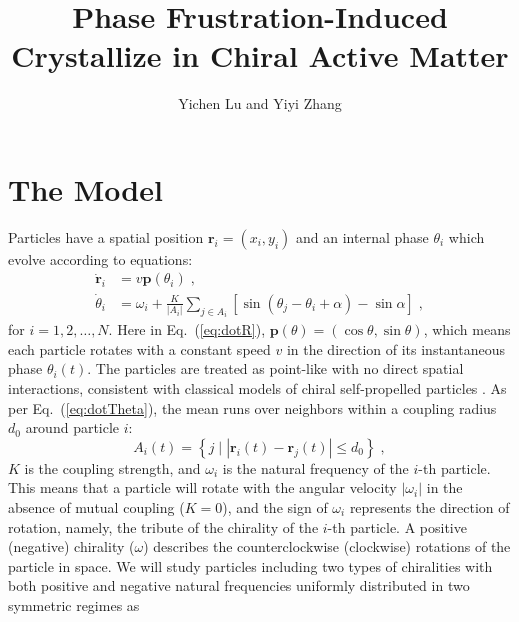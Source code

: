 \documentclass{article}
\title{\textbf{Phase Frustration-Induced Crystallize in Chiral Active Matter}}
\author{Yichen Lu and Yiyi Zhang}
\begin{document}
\maketitle

\tableofcontents

\section{The Model}

Particles have a spatial position $\mathbf{r}_i=\left( x_i, y_i \right)$ and an internal phase $\theta_i$ which evolve according to equations:
\begin{subequations} 
    \label{eq:totalDynamicsMeanField}
    \begin{align}
        \dot{\mathbf{r}}_i&=v\mathbf{p}\left( \theta _i \right)\;\label{eq:dotR},
        \\
        \dot{\theta}_i&=\omega _i+\frac{K}{\left| A_i \right|}\sum_{j\in A_i}{\left[ \sin \left( \theta _j-\theta _i+\alpha \right) -\sin \alpha \right]}\;\label{eq:dotTheta},
    \end{align}
\end{subequations}
for $i=1,2,\ldots,N$. Here in Eq.~(\ref{eq:dotR}), $\mathbf{p}\left( \theta \right) =\left( \cos \theta ,\sin \theta \right)$, which means each particle rotates with a constant speed $v$ in the direction of its instantaneous phase $\theta_i (t)$. 
The particles are treated as point-like with no direct spatial interactions, consistent with classical models of chiral self-propelled particles \cite{PhysRevResearch.1.023026,PhysRevLett.119.058002,Fruchart2021,PhysRevLett.127.238001,PhysRevLett.133.258302}.
As per Eq.~(\ref{eq:dotTheta}), the mean runs over neighbors within a coupling radius $d_0$ around particle $i$:
\begin{equation}
    A_i\left( t \right) =\left\{ j\mid \left| \mathbf{r}_i\left( t \right) -\mathbf{r}_j\left( t \right) \right|\leqslant d_0 \right\} \;,
\end{equation}
$K$ is the coupling strength, and $\omega_i$ is the natural frequency of the $i$-th particle. 
This means that a particle will rotate with the angular velocity $|\omega_i |$ in the absence of mutual coupling ($K=0$), and the sign of $\omega_i$ represents the direction of rotation, namely, the tribute of the chirality of the $i$-th particle. A positive (negative) chirality ($\omega$) describes the counterclockwise (clockwise) rotations of the particle in space. 
We will study particles including two types of chiralities with both positive and negative natural frequencies uniformly distributed in two symmetric regimes as 
\end{document}
